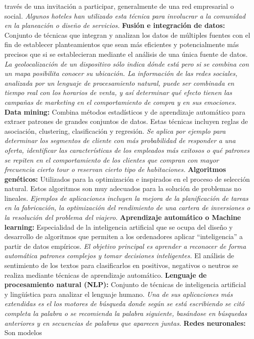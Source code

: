 \documentclass[
  letterpaper,
  DIV=11,
  numbers=noendperiod]{scrreprt}
\begin{document}
través de una invitación a participar, generalmente de una red
empresarial o social. \emph{Algunos hoteles han utilizado esta técnica
para involucrar a la comunidad en la planeación o diseño de servicios.}
\textbf{Fusión e integración de datos:} Conjunto de técnicas que
integran y analizan los datos de múltiples fuentes con el fin de
establecer planteamientos que sean más eficientes y potencialmente más
precisos que si se establecieran mediante el análisis de una única
fuente de datos. \emph{La geolocalización de un dispositivo sólo indica
dónde está pero si se combina con un mapa posibilita conocer su
ubicación. La información de las redes sociales, analizada por un
lenguaje de procesamiento natural, puede ser combinada en tiempo real
con los horarios de venta, y así determinar qué efecto tienen las
campañas de marketing en el comportamiento de compra y en sus
emociones.} \textbf{Data mining:} Combina métodos estadísticos y de
aprendizaje automático para extraer patrones de grandes conjuntos de
datos. Estas técnicas incluyen reglas de asociación, clustering,
clasificación y regresión. \emph{Se aplica por ejemplo para determinar
los segmentos de cliente con más probabilidad de responder a una oferta,
identificar las características de los empleados más exitosos o qué
patrones se repiten en el comportamiento de los clientes que compran con
mayor frecuencia cierto tour o reservan cierto tipo de habitaciones.}
\textbf{Algoritmos genéticos:} Utilizados para la optimización e
inspirados en el proceso de selección natural. Estos algoritmos son muy
adecuados para la solución de problemas no lineales. \emph{Ejemplos de
aplicaciones incluyen la mejora de la planificación de tareas en la
fabricación, la optimización del rendimiento de una cartera de
inversiones o la resolución del problema del viajero.}
\textbf{Aprendizaje automático o Machine learning:} Especialidad de la
inteligencia artificial que se ocupa del diseño y desarrollo de
algoritmos que permiten a los ordenadores aplicar ``inteligencia'' a
partir de datos empíricos. \emph{El objetivo principal es aprender a
reconocer de forma automática patrones complejos y tomar decisiones
inteligentes.} El análisis de sentimiento de los textos para
clasificarlos en positivos, negativos o neutros se realiza mediante
técnicas de aprendizaje automático. \textbf{Lenguaje de procesamiento
natural (NLP):} Conjunto de técnicas de inteligencia artificial y
lingüística para analizar el lenguaje humano. \emph{Una de sus
aplicaciones más extendidas es el los motores de búsqueda donde según se
está escribiendo se citó completa la palabra o se recomienda la palabra
siguiente, basándose en búsquedas anteriores y en secuencias de palabras
que aparecen juntas.} \textbf{Redes neuronales:} Son modelos
\end{document}
